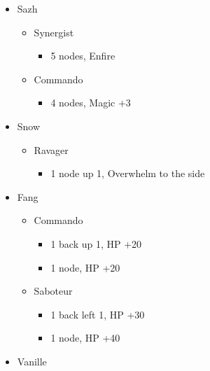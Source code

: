 \begin{paracol}{2}
\begin{menu}
\begin{itemize}
		\end{itemize}
	\end{menu}
	\switchcolumn
	\begin{menu}
		\begin{itemize}
			\crystarium
			\begin{itemize}
				\item Sazh
				      \begin{itemize}
					      \item Synergist
					            \begin{itemize}
						            \item 5 nodes, Enfire
					            \end{itemize}
					      \item Commando
					            \begin{itemize}
						            \item 4 nodes, Magic +3
					            \end{itemize}
				      \end{itemize}
				\item Snow
				      \begin{itemize}
					      \item Ravager
					            \begin{itemize}
						            \item 1 node up 1, Overwhelm to the side
					            \end{itemize}
				      \end{itemize}
				\item Fang
				      \begin{itemize}
					      \item Commando
					            \begin{itemize}
						            \item 1 back up 1, HP +20
						            \item 1 node, HP +20
					            \end{itemize}
					      \item Saboteur
					            \begin{itemize}
						            \item 1 back left 1, HP +30
						            \item 1 node, HP +40
					            \end{itemize}
				      \end{itemize}
				\item Vanille
				      \begin{itemize}

\end{itemize}
\end{itemize}
\end{itemize}
\end{menu}
\end{paracol}
